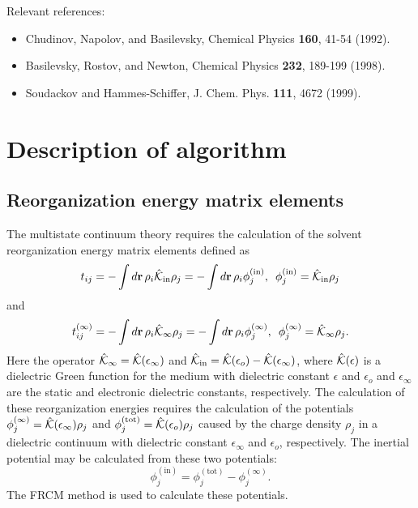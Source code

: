 \documentclass[oneside,11pt,openany]{book}
\begin{document}
Relevant references:
\begin{itemize}
\item{Chudinov, Napolov, and Basilevsky, Chemical Physics {\bf 160}, 41-54 (1992).}
\item{
Basilevsky, Rostov, and Newton, Chemical Physics {\bf 232}, 189-199 (1998).}
\item{
Soudackov and Hammes-Schiffer, J. Chem. Phys. {\bf 111}, 4672 (1999).}
\end{itemize}
\section*{Description of algorithm}
\subsection*{Reorganization energy matrix elements}
The multistate continuum theory requires the calculation
of the solvent
reorganization energy matrix elements defined as
\begin{equation}
t_{ij}=-\int d{\bf r}\, \rho_i \hat{\cal{K}}_{\mathrm{in}} \rho_j
= -\int d{\bf r}\, \rho_i \phi_j^{\mathrm{(in)}},\,\,\, \phi_j^{\mathrm{(in)}}=\hat{\cal{K}}_{\mathrm{in}} \rho_j
\end{equation}
and
\begin{equation}
t_{ij}^{(\infty)}=-\int d{\bf r}\, \rho_i \hat{\cal{K}}_{\infty} \rho_j
= -\int d{\bf r}\, \rho_i \phi_j^{(\infty)},\,\,\, \phi_j^{(\infty)}=\hat{\cal{K}}_{\infty} \rho_j.
\end{equation}
Here the operator $\hat{\cal{K}}_\infty=\hat{\cal{K}}(\epsilon_\infty)$
and $\hat{\cal{K}}_{\mathrm{in}}=\hat{\cal{K}}(\epsilon_o)-
\hat{\cal{K}}(\epsilon_\infty)$,
where $\hat{\cal{K}}(\epsilon)$ is a dielectric Green
function for the medium with dielectric constant $\epsilon$ and
$\epsilon_o$ and $\epsilon_\infty$ are the static and
electronic dielectric constants, respectively.
The calculation of these reorganization energies
requires the calculation of the potentials
$\phi_j^{(\infty)}=\hat{\cal{K}}(\epsilon_\infty) \rho_j$ and
$\phi_j^{\mathrm{(tot)}} = \hat{\cal{K}}(\epsilon_o) \rho_j$
caused by the charge density $\rho_j$ in a dielectric continuum
with dielectric constant $\epsilon_\infty$ and $\epsilon_o$, respectively.
The inertial potential may be calculated from these
two potentials: 
\begin{equation}
\phi_j^{\mathrm{(in)}}=\phi_j^{\mathrm{(tot)}}
- \phi_j^{\mathrm{(\infty)}}.
\label{eq.phiin}
\end{equation}
The FRCM method is used to calculate these potentials.
%
\end{document}
